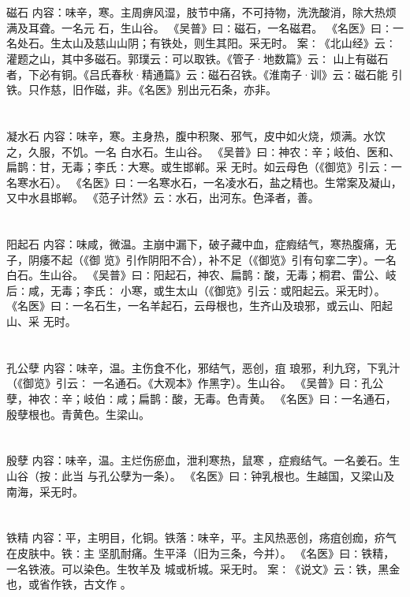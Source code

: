\documentclass[12pt,UTF8]{ctexbook}
\begin{document}
\section{}磁石
内容：味辛，寒。主周痹风湿，肢节中痛，不可持物，洗洗酸消，除大热烦满及耳聋。一名元 
石，生山谷。 
《吴普》曰∶磁石，一名磁君。 
《名医》曰∶一名处石。生太山及慈山山阴；有铁处，则生其阳。采无时。 
案∶《北山经》云∶灌题之山，其中多磁石。郭璞云∶可以取铁。《管子·地数篇》云∶ 
山上有磁石者，下必有铜。《吕氏春秋·精通篇》云∶磁石召铁。《淮南子·训》云∶磁石能 
引铁。只作慈，旧作磁，非。《名医》别出元石条，亦非。 


\section{}凝水石
内容：味辛，寒。主身热，腹中积聚、邪气，皮中如火烧，烦满。水饮之，久服，不饥。一名 
白水石。生山谷。 
《吴普》曰∶神农∶辛；岐伯、医和、扁鹊∶甘，无毒；李氏∶大寒。或生邯郸。采 
无时。如云母色（《御览》引云∶一名寒水石）。 
《名医》曰∶一名寒水石，一名凌水石，盐之精也。生常案及凝山，又中水县邯郸。 
《范子计然》云∶水石，出河东。色泽者，善。 


\section{}阳起石
内容：味咸，微温。主崩中漏下，破子藏中血，症瘕结气，寒热腹痛，无子，阴痿不起（《御 
览》引作阴阳不合），补不足（《御览》引有句挛二字）。一名白石。生山谷。 
《吴普》曰∶阳起石，神农、扁鹊∶酸，无毒；桐君、雷公、岐后∶咸，无毒；李氏∶ 
小寒，或生太山（《御览》引云∶或阳起云。采无时）。 
《名医》曰∶一名石生，一名羊起石，云母根也，生齐山及琅邪，或云山、阳起山、采 
无时。 


\section{}孔公孽
内容：味辛，温。主伤食不化，邪结气，恶创，疽 琅邪，利九窍，下乳汁（《御览》引云∶ 
一名通石。《大观本》作黑字）。生山谷。 
《吴普》曰∶孔公孽，神农∶辛；岐伯∶咸；扁鹊∶酸，无毒。色青黄。 
《名医》曰∶一名通石，殷孽根也。青黄色。生梁山。 


\section{}殷孽
内容：味辛，温。主烂伤瘀血，泄利寒热，鼠寒 ，症瘕结气。一名姜石。生山谷（按∶此当 
与孔公孽为一条）。 
《名医》曰∶钟乳根也。生越国，又梁山及南海，采无时。 


\section{}铁精
内容：平，主明目，化铜。铁落∶味辛，平。主风热恶创，疡疽创痂，疥气在皮肤中。铁∶主 
坚肌耐痛。生平泽（旧为三条，今并）。 
《名医》曰∶铁精，一名铁液。可以染色。生牧羊及 城或析城。采无时。 
案∶《说文》云∶铁，黑金也，或省作铁，古文作 。 
\end{document}

